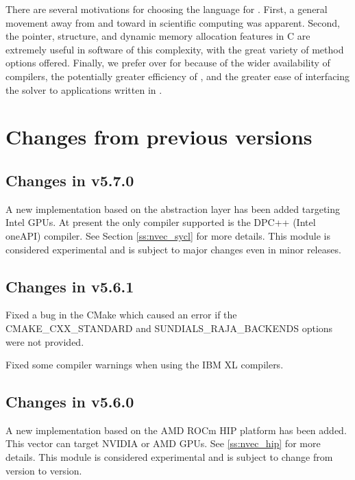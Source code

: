  There are
several motivations for choosing the {\CC} language for {\kinsol}.
First, a general movement away from {\F} and toward {\CC} in
scientific computing was apparent. Second, the pointer, structure,
and dynamic memory allocation features in C are extremely useful
in software of this complexity, with the great variety of method
options offered. Finally, we prefer {\CC} over {\CPP} for {\kinsol}
because of the wider availability of {\CC} compilers, the
potentially greater efficiency of {\CC}, and the greater ease of
interfacing the solver to applications written in {\F}.


\section{Changes from previous versions}

\subsection*{Changes in v5.7.0}

A new {\nvector} implementation based on the {\sycl} abstraction layer has been
added targeting Intel GPUs. At present the only {\sycl} compiler supported is
the DPC++ (Intel oneAPI) compiler. See Section \ref{ss:nvec_sycl} for more
details. This module is considered experimental and is subject to major changes
even in minor releases.

\subsection*{Changes in v5.6.1}

Fixed a bug in the {\sundials} CMake which caused an error
if the CMAKE\_CXX\_STANDARD and SUNDIALS\_RAJA\_BACKENDS options
were not provided.

Fixed some compiler warnings when using the IBM XL compilers.

\subsection*{Changes in v5.6.0}

A new {\nvector} implementation based on the AMD ROCm HIP platform has been
added. This vector can target NVIDIA or AMD GPUs. See \ref{ss:nvec_hip} for more
details. This module is considered experimental and is subject to change from
version to version.


